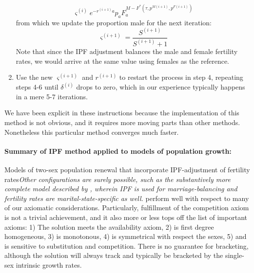 \begin{enumerate}
\begin{equation}
{  \varsigma^{(i)} e^{-r^{(i+1)}a}p_aF_a^{M-F^\ast(\tau,p^{M(i+1)}, p^{F(i+1)})}}
  \end{equation}
  from which we update the proportion male for the next iteration:
  \begin{equation}
  \varsigma^{(i+1)} = \frac{S^{(i+1)}}{S^{(i+1)}+1}
  \end{equation} 
  Note that since the IPF adjustment balances the male and female fertility
  rates, we would arrive at the same value using females as the reference.
  \item Use the new $\varsigma^{(i+1)}$ and $r^{(i+1)}$ to restart the process
  in step 4, repeating steps 4-6 until $\delta^{(i)}$ drops to zero, which
  in our experience typically happens in a mere 5-7 iterations.
\end{enumerate}

We have been explicit in these instructions because the implementation of this
method is not obvious, and it requires more moving parts than other
methods. Nonetheless this particular method converges much faster.

\paragraph{Summary of IPF method applied to models of population growth:
}
Models of two-sex population renewal that incorporate IPF-adjustment of
fertility rates\textit{Other configurations are surely possible, such as the
substantively more complete model described by \citet{Matthews2013}, wherein IPF
is used for marriage-balancing and fertility rates are marital-state-specific
as well.} perform well with respect to many of our axiomatic considerations.
Particularly, fulfillment of the competition axiom is not a trivial achievement, 
and it also more or less tops off the list of important axioms: 1) The solution
 meets the availability axiom, 2) is first degree homogeneous, 3) is monotonous, 4) is symmetrical with
respect the sexes, 5) and is sensitive to substitution and competition. There is no
guarantee for bracketing, although the solution will always track and typically
be bracketed by the single-sex intrinsic growth rates. 

